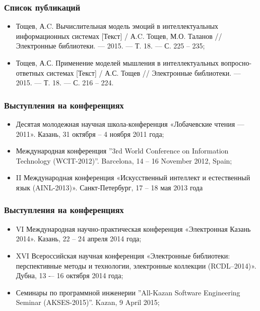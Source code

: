 \documentclass[14pt]{beamer}
\begin{document}
\begin{frame}
\frametitle{Список публикаций}

\begin{itemize}
	\item Тощев, А.C. Вычислительная модель эмоций в интеллектуальных информационных системах [Текст] / А.C. Тощев, М.О. Таланов // Электронные библиотеки. –– 2015. –– Т. 18. –– С. 225 – 235;
	\item Тощев, А.С. Применение моделей мышления в интеллектуальных вопросно-ответных системах [Текст] / А.С. Тощев // Электронные библиотеки. –– 2015. –– Т. 18. –– С. 216 – 224.
\end{itemize}
\end{frame}


\begin{frame}
\frametitle{Выступления на конференциях}

\begin{itemize}
	\item Десятая молодежная научная школа-конференция «Лобачевские чтения —2011». Казань, 31 октября – 4 ноября 2011 года;
	\item Международная конференция ”3rd World Conference on Information Technology (WCIT-2012)”. Barcelona, 14 – 16 November 2012, Spain;
	\item II Международная конференция «Искусственный интеллект и естественный язык (AINL-2013)». Санкт-Петербург, 17 – 18 мая 2013 года
	
	
\end{itemize}
\end{frame}


\begin{frame}
\frametitle{Выступления на конференциях}

\begin{itemize}
	\item VI Международная научно-практическая конференция «Электронная Казань 2014». Казань, 22 – 24 апреля 2014 года;
\item XVI Всероссийская научная конференция «Электронные библиотеки: перспективные методы и технологии, электронные коллекции (RCDL--2014)». Дубна, 13 -– 16 октября 2014 года;
\item Семинары по программной инженерии ”All-Kazan Software Engineering Seminar (AKSES-2015)”. Kazan, 9 April 2015;


	
	
\end{itemize}
\end{frame}
\end{document}
